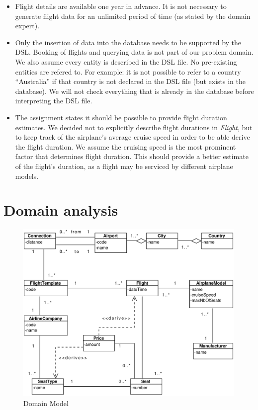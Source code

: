 \documentclass[a4paper]{article}
\newcommand{\field}[1]{\emph{#1}}
\begin{document}
\begin{itemize}
\item Flight details are available one year in advance. It is not necessary to generate flight data for an unlimited period of time (as stated by the domain expert).\\

\item Only the insertion of data into the database needs to be supported by the DSL.
Booking of flights and querying data is not part of our problem domain.
We also assume every entity is described in the DSL file.
No pre-existing entities are refered to.
For example: it is not possible to refer to a country ``Australia'' if that country is not declared in the DSL file (but exists in the database).
We will not check everything that is already in the database before interpreting the DSL file.\\

\item The assignment states it should be possible to provide flight duration estimates.
We decided not to explicitly describe flight durations in \field{Flight}, but to keep track of the airplane's average cruise speed in order to be able derive the flight duration.
We assume the cruising speed is the most prominent factor that determines flight duration.
This should provide a better estimate of the flight's duration, as a flight may be serviced by different airplane models.\\


\end{itemize}

\section{Domain analysis}
\label{sec:domain-analysis}

\begin{figure}[ht!]
  \includegraphics[width=1.0\textwidth]{../analysis/domainModel.pdf}
  \caption{Domain Model}\label{fig:domain-model}
\end{figure}
\end{document}
